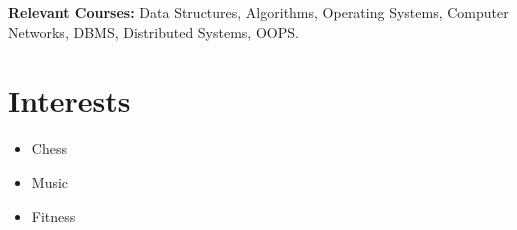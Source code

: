 \documentclass[a4paper,10pt]{article}
\newcommand{\resumeItem}[1]{\item\small{#1}}
\begin{document}
\vspace{4pt}
\textbf{Relevant Courses:} Data Structures, Algorithms, Operating Systems, Computer Networks, DBMS, Distributed Systems, OOPS.

\section*{Interests}
\begin{itemize}[leftmargin=*,itemsep=2pt]
  \resumeItem{Chess}
  \resumeItem{Music}
  \resumeItem{Fitness}
\end{itemize}
\end{document}

